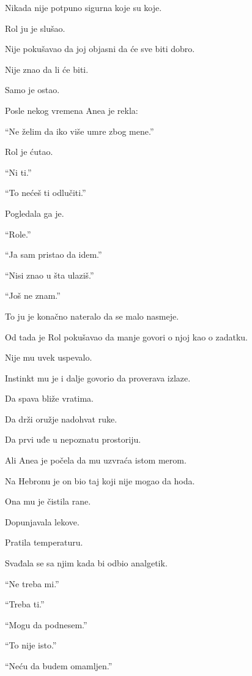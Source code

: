 Nikada nije potpuno sigurna koje su koje.

\bigskip

Rol ju je slušao.

Nije pokušavao da joj objasni da će sve biti dobro.

Nije znao da li će biti.

\bigskip

Samo je ostao.

\bigskip

Posle nekog vremena Anea je rekla:

``Ne želim da iko više umre zbog mene.''

Rol je ćutao.

``Ni ti.''

``To nećeš ti odlučiti.''

Pogledala ga je.

``Role.''

``Ja sam pristao da idem.''

``Nisi znao u šta ulaziš.''

``Još ne znam.''

\bigskip

To ju je konačno nateralo da se malo nasmeje.

\bigskip

Od tada je Rol pokušavao da manje govori o njoj kao o zadatku.

Nije mu uvek uspevalo.

Instinkt mu je i dalje govorio da proverava izlaze.

Da spava bliže vratima.

Da drži oružje nadohvat ruke.

Da prvi uđe u nepoznatu prostoriju.

\bigskip

Ali Anea je počela da mu uzvraća istom merom.

Na Hebronu je on bio taj koji nije mogao da hoda.

Ona mu je čistila rane.

Dopunjavala lekove.

Pratila temperaturu.

Svađala se sa njim kada bi odbio analgetik.

\bigskip

``Ne treba mi.''

``Treba ti.''

``Mogu da podnesem.''

``To nije isto.''

``Neću da budem omamljen.''

